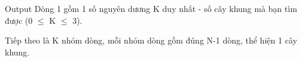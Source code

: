 Output
Dòng 1 gồm 1 số nguyên dương K duy nhất - số cây khung mà bạn tìm được (0  $\le$  K  $\le$  3).


Tiếp theo là K nhóm dòng, mỗi nhóm dòng gồm đúng N-1 dòng, thể hiện 1 cây khung.